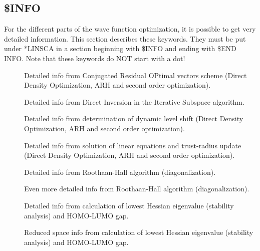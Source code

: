 \begin{description}
\subsection{\$INFO}\label{subsec:info}
For the different parts of the wave function optimization, it is possible
to get very detailed information.
This section describes these keywords. They must be put
under *LINSCA in a section beginning with
\$INFO and ending with \$END INFO. Note that these keywords
do NOT start with a dot!
\begin{description}
\item[] Detailed info from Conjugated Residual OPtimal vectors scheme (Direct Density Optimization, ARH and second order optimization).
\item[] Detailed info from Direct Inversion in the Iterative Subspace algorithm.
\item[] Detailed info from determination of dynamic level shift (Direct Density Optimization, ARH and second order optimization). 
\item[] Detailed info from solution of linear equations and trust-radius update (Direct Density Optimization, ARH and second order optimization).
\item[] Detailed info from Roothaan-Hall algorithm (diagonalization).
\item[] Even more detailed info from Roothaan-Hall algorithm (diagonalization).
\item[] Detailed info from calculation of lowest Hessian eigenvalue (stability analysis) and HOMO-LUMO gap.
\item[] Reduced space info from calculation of lowest Hessian eigenvalue (stability analysis) and HOMO-LUMO gap.
\item[\Keyinfo{}]
\end{description}\end{description}

